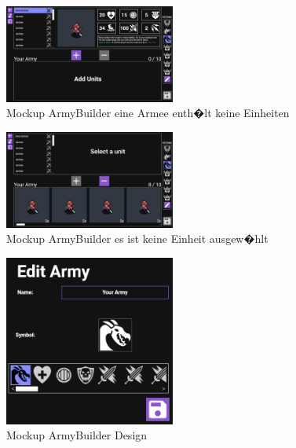 \documentclass[12pt, titlepage]{scrartcl}
\begin{document}
		\begin{figure}[H] 
			\centering
			\includegraphics[width=0.5\textwidth]{Army_Builder_Add_Units.png}
			\caption{Mockup ArmyBuilder eine Armee enth�lt keine Einheiten}
			\label{ArmyBuilder_AddUnits}
		\end{figure}
		\begin{figure}[H] 
			\centering
			\includegraphics[width=0.5\textwidth]{ArmyBuilder_Select_Unit.png}
			\caption{Mockup ArmyBuilder es ist keine Einheit ausgew�hlt}
			\label{ArmyBuilder_Select_Unit}
		\end{figure}
		\begin{figure}[H] 
			\centering
			\includegraphics[width=0.5\textwidth]{ArmyEditor.png}
			\caption{Mockup ArmyBuilder Design}
			\label{AmryEditor}
		\end{figure}
		
\end{document}

